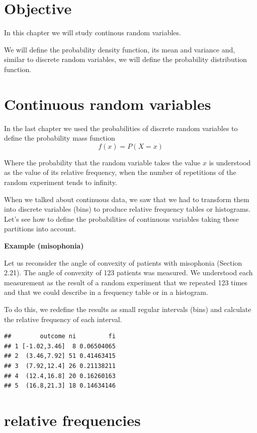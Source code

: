 \documentclass[
]{book}
\begin{document}
\hypertarget{objective-2}{%
\section{Objective}\label{objective-2}}

In this chapter we will study continous random variables.

We will define the probability density function, its mean and variance and, similar to discrete random variables, we will define the probability distribution function.

\hypertarget{continuous-random-variables}{%
\section{Continuous random variables}\label{continuous-random-variables}}

In the last chapter we used the probabilities of discrete random variables to define the probability mass function \[f(x)=P(X= x)\]

Where the probability that the random variable takes the value \(x\) is understood as the value of its relative frequency, when the number of repetitions of the random experiment tends to infinity.

When we talked about continuous data, we saw that we had to transform them into discrete variables (bins) to produce relative frequency tables or histograms. Let's see how to define the probabilities of continuous variables taking these partitions into account.

\textbf{Example (misophonia)}

Let us reconsider the angle of convexity of patients with misophonia (Section 2.21). The angle of convexity of 123 patients was measured. We understood each measurement as the result of a random experiment that we repeated 123 times and that we could describe in a frequency table or in a histogram.

To do this, we redefine the results as small regular intervals (bins) and calculate the relative frequency of each interval.

\begin{verbatim}
##        outcome ni         fi
## 1 [-1.02,3.46]  8 0.06504065
## 2  (3.46,7.92] 51 0.41463415
## 3  (7.92,12.4] 26 0.21138211
## 4  (12.4,16.8] 20 0.16260163
## 5  (16.8,21.3] 18 0.14634146
\end{verbatim}

\hypertarget{relative-frequencies-3}{%
\section{relative frequencies}\label{relative-frequencies-3}}
\end{document}
